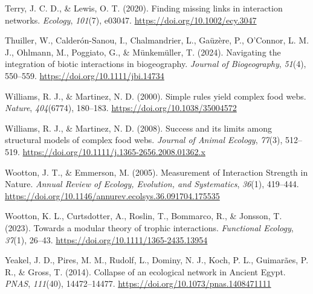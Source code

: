 \documentclass[
]{article}
\newlength{\cslhangindent}
\newenvironment{CSLReferences}[2] %
 {\begin{list}{}{%
  \setlength{\itemindent}{0pt}
  \setlength{\leftmargin}{0pt}
  \setlength{\parsep}{0pt}
  \ifodd #1
   \setlength{\leftmargin}{\cslhangindent}
   \setlength{\itemindent}{-1\cslhangindent}
  \fi
  \setlength{\itemsep}{#2\baselineskip}}}
 {\end{list}}
\begin{document}
\begin{CSLReferences}{1}{0}
Terry, J. C. D., \& Lewis, O. T. (2020). Finding missing links in
interaction networks. \emph{Ecology}, \emph{101}(7), e03047.
\url{https://doi.org/10.1002/ecy.3047}

Thuiller, W., Calderón-Sanou, I., Chalmandrier, L., Gaüzère, P.,
O'Connor, L. M. J., Ohlmann, M., Poggiato, G., \& Münkemüller, T.
(2024). Navigating the integration of biotic interactions in
biogeography. \emph{Journal of Biogeography}, \emph{51}(4), 550--559.
\url{https://doi.org/10.1111/jbi.14734}

Williams, R. J., \& Martinez, N. D. (2000). Simple rules yield complex
food webs. \emph{Nature}, \emph{404}(6774), 180--183.
\url{https://doi.org/10.1038/35004572}

Williams, R. J., \& Martinez, N. D. (2008). Success and its limits among
structural models of complex food webs. \emph{Journal of Animal
Ecology}, \emph{77}(3), 512--519.
\url{https://doi.org/10.1111/j.1365-2656.2008.01362.x}

Wootton, J. T., \& Emmerson, M. (2005). Measurement of {Interaction
Strength} in {Nature}. \emph{Annual Review of Ecology, Evolution, and
Systematics}, \emph{36}(1), 419--444.
\url{https://doi.org/10.1146/annurev.ecolsys.36.091704.175535}

Wootton, K. L., Curtsdotter, A., Roslin, T., Bommarco, R., \& Jonsson,
T. (2023). Towards a modular theory of trophic interactions.
\emph{Functional Ecology}, \emph{37}(1), 26--43.
\url{https://doi.org/10.1111/1365-2435.13954}

Yeakel, J. D., Pires, M. M., Rudolf, L., Dominy, N. J., Koch, P. L.,
Guimarães, P. R., \& Gross, T. (2014). Collapse of an ecological network
in {Ancient Egypt}. \emph{PNAS}, \emph{111}(40), 14472--14477.
\url{https://doi.org/10.1073/pnas.1408471111}

\end{CSLReferences}
\end{document}
